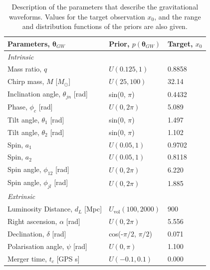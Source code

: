 \begin{table}[htb]
\centering
\caption{Description of the parameters that describe the gravitational waveforms. Values for the target observation $x_0$, and the range and distribution functions of the priors are also given.}
\label{tab:gw_parameters}
\begin{tabular}{lll} 
\toprule
\textbf{Parameters, $\boldsymbol{\theta}_{GW}$} & \textbf{Prior, $p(\boldsymbol{\theta}_{GW})$} & \textbf{Target, $x_0$} \\ 
\midrule
\textit{Intrinsic} & & \\ 
Mass ratio, \( q \) & \( U(0.125, 1) \) & 0.8858 \\ 
Chirp mass, \( M \) [\( M_{\odot} \)] & \( U(25, 100) \) & 32.14 \\ 
Inclination angle, \( \theta_{jn} \) [rad] & sin(0, \( \pi \)) & 0.4432 \\ 
Phase, \( \phi_c \) [rad] & \( U(0, 2\pi) \) & 5.089 \\ 
Tilt angle, \( \theta_1 \) [rad] & sin(0, \( \pi \)) & 1.497 \\ 
Tilt angle, \( \theta_2 \) [rad] & sin(0, \( \pi \)) & 1.102 \\ 
Spin, \( a_1 \) & \( U(0.05, 1) \) & 0.9702 \\ 
Spin, \( a_2 \) & \( U(0.05, 1) \) & 0.8118 \\ 
Spin angle, \( \phi_{12} \) [rad] & \( U(0, 2\pi) \) & 6.220 \\ 
Spin angle, \( \phi_{jl} \) [rad] & \( U(0, 2\pi) \) & 1.885 \\ 
\midrule
\textit{Extrinsic} & & \\ 
Luminosity Distance, \( d_L \) [Mpc] & \( U_{\text{vol}}(100, 2000) \) & 900 \\ 
Right ascension, \( \alpha \) [rad] & \( U(0, 2\pi) \) & 5.556 \\ 
Declination, \( \delta \) [rad] & cos(-\( \pi/2 \), \( \pi/2 \)) & 0.071 \\ 
Polarisation angle, \( \psi \) [rad] & \( U(0, \pi) \) & 1.100 \\ 
Merger time, \( t_c \) [GPS s] & \( U(-0.1, 0.1) \) & 0.000 \\ 
\bottomrule
\end{tabular}
\end{table}


